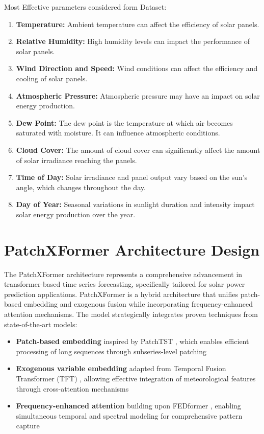 \documentclass[12pt]{uomthesis}
\begin{document}
Most Effective parameters considered form Dataset:
\begin{enumerate}
    \item \textbf{Temperature:} Ambient temperature can affect the efficiency of solar panels.
    \item \textbf{Relative Humidity:} High humidity levels can impact the performance of solar panels.
    \item \textbf{Wind Direction and Speed:} Wind conditions can affect the efficiency and cooling of solar panels.
    \item \textbf{Atmospheric Pressure:} Atmospheric pressure may have an impact on solar energy production.
    \item \textbf{Dew Point:} The dew point is the temperature at which air becomes saturated with moisture. It can influence atmospheric conditions.
    \item \textbf{Cloud Cover:} The amount of cloud cover can significantly affect the amount of solar irradiance reaching the panels.
    \item \textbf{Time of Day:} Solar irradiance and panel output vary based on the sun’s angle, which changes throughout the day.
    \item \textbf{Day of Year:} Seasonal variations in sunlight duration and intensity impact solar energy production over the year.
\end{enumerate}

\section{PatchXFormer Architecture Design}

The PatchXFormer architecture represents a comprehensive advancement in transformer-based time series forecasting, specifically tailored for solar power prediction applications. PatchXFormer is a hybrid architecture that unifies patch-based embedding and exogenous fusion while incorporating frequency-enhanced attention mechanisms. The model strategically integrates proven techniques from state-of-the-art models:

\begin{itemize}
\item \textbf{Patch-based embedding} inspired by PatchTST \cite{nie2022patchtst}, which enables efficient processing of long sequences through subseries-level patching
\item \textbf{Exogenous variable embedding} adapted from Temporal Fusion Transformer (TFT) \cite{lim2021temporal}, allowing effective integration of meteorological features through cross-attention mechanisms
\item \textbf{Frequency-enhanced attention} building upon FEDformer \cite{zhou2022fedformer}, enabling simultaneous temporal and spectral modeling for comprehensive pattern capture
\end{itemize}
\end{document}
